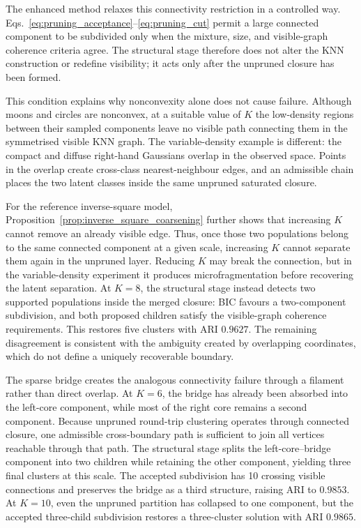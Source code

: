 \documentclass[review,12pt]{elsarticle}
\begin{document}
The enhanced method relaxes this connectivity restriction in a controlled
way. Eqs.~\eqref{eq:pruning_acceptance}--\eqref{eq:pruning_cut} permit a
large connected component to be subdivided only when the mixture, size, and
visible-graph coherence criteria agree. The structural stage therefore does
not alter the KNN construction or redefine visibility; it acts only after
the unpruned closure has been formed.

This condition explains why nonconvexity alone does not cause failure.
Although moons and circles are nonconvex, at a suitable value of $K$ the
low-density regions between their sampled components leave no visible path connecting them in the symmetrised visible KNN graph. The variable-density example
is different: the compact and diffuse right-hand Gaussians overlap in the
observed space. Points in the overlap create cross-class nearest-neighbour
edges, and an admissible chain places the two latent classes inside the same
unpruned saturated closure.

For the reference inverse-square model,
Proposition~\ref{prop:inverse_square_coarsening} further shows that increasing
$K$ cannot remove an already visible edge. Thus, once those two populations
belong to the same connected component at a given scale, increasing $K$ cannot
separate them again in the unpruned layer. Reducing $K$ may break the
connection, but in the variable-density experiment it produces
microfragmentation before recovering the latent separation. At $K=8$, the
structural stage instead detects two supported populations inside the merged
closure: BIC favours a two-component subdivision, and both proposed children
satisfy the visible-graph coherence requirements. This restores five clusters
with ARI $0.9627$. The remaining disagreement is consistent with the ambiguity
created by overlapping coordinates, which do not define a uniquely recoverable
boundary.

The sparse bridge creates the analogous connectivity failure through a
filament rather than direct overlap. At $K=6$, the bridge has already been
absorbed into the left-core component, while most of the right core remains a
second component. Because unpruned round-trip clustering operates through
connected closure, one admissible cross-boundary path is sufficient to join
all vertices reachable through that path. The structural stage splits the left-core--bridge component into two
children while retaining the other component, yielding three final clusters
at this scale. The accepted subdivision has 10 crossing visible connections
and preserves the bridge as a third structure,
raising ARI to $0.9853$. At $K=10$, even the unpruned partition has collapsed
to one component, but the accepted three-child subdivision restores a
three-cluster solution with ARI $0.9865$.
\end{document}
